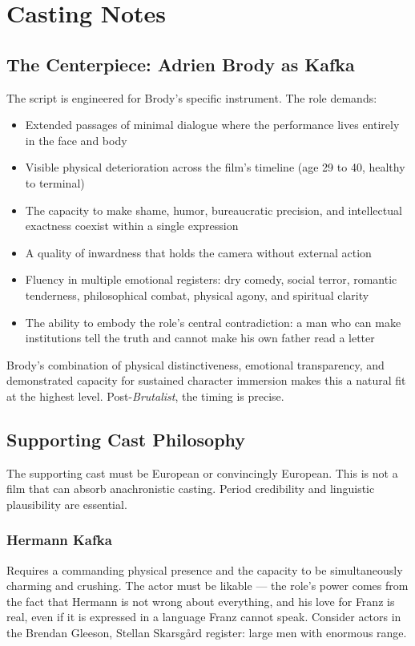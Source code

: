 
\section{Casting Notes}

\subsection{The Centerpiece: Adrien Brody as Kafka}

The script is engineered for Brody's specific instrument. The role demands:

\begin{itemize}[leftmargin=*]
\item Extended passages of minimal dialogue where the performance lives entirely in the face and body
\item Visible physical deterioration across the film's timeline (age 29 to 40, healthy to terminal)
\item The capacity to make shame, humor, bureaucratic precision, and intellectual exactness coexist within a single expression
\item A quality of inwardness that holds the camera without external action
\item Fluency in multiple emotional registers: dry comedy, social terror, romantic tenderness, philosophical combat, physical agony, and spiritual clarity
\item The ability to embody the role's central contradiction: a man who can make institutions tell the truth and cannot make his own father read a letter
\end{itemize}

Brody's combination of physical distinctiveness, emotional transparency, and demonstrated capacity for sustained character immersion makes this a natural fit at the highest level. Post-\textit{Brutalist}, the timing is precise.

\subsection{Supporting Cast Philosophy}

The supporting cast must be European or convincingly European. This is not a film that can absorb anachronistic casting. Period credibility and linguistic plausibility are essential.

\subsubsection{Hermann Kafka}
Requires a commanding physical presence and the capacity to be simultaneously charming and crushing. The actor must be likable --- the role's power comes from the fact that Hermann is not wrong about everything, and his love for Franz is real, even if it is expressed in a language Franz cannot speak. Consider actors in the Brendan Gleeson, Stellan Skarsgård register: large men with enormous range.

